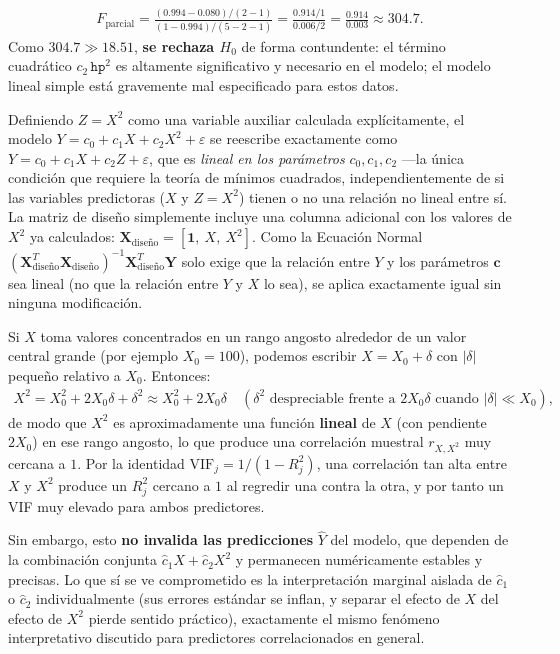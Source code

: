 \begin{solproblema}
	\begin{align}
		F_{\text{parcial}} = \frac{(0.994-0.080)/(2-1)}{(1-0.994)/(5-2-1)} = \frac{0.914/1}{0.006/2} = \frac{0.914}{0.003} \approx304.7.
	\end{align}
	Como $304.7\gg18.51$, \textbf{se rechaza $H_0$} de forma contundente: el término cuadrático $c_2\,\texttt{hp}^2$ es altamente significativo y necesario en el modelo; el modelo lineal simple está gravemente mal especificado para estos datos.
\end{solproblema}

\begin{solproblema}[prob:c772cd1]
	Definiendo $Z=X^2$ como una variable auxiliar calculada explícitamente, el modelo $Y=c_0+c_1X+c_2X^2+\varepsilon$ se reescribe exactamente como $Y=c_0+c_1X+c_2Z+\varepsilon$, que es \emph{lineal en los parámetros} $c_0,c_1,c_2$ —la única condición que requiere la teoría de mínimos cuadrados, independientemente de si las variables predictoras ($X$ y $Z=X^2$) tienen o no una relación no lineal entre sí. La matriz de diseño simplemente incluye una columna adicional con los valores de $X^2$ ya calculados: $\mathbf{X}_{\text{diseño}}=[\mathbf{1},\ X,\ X^2]$. Como la Ecuación Normal $(\mathbf{X}_{\text{diseño}}^T\mathbf{X}_{\text{diseño}})^{-1}\mathbf{X}_{\text{diseño}}^T\mathbf{Y}$ solo exige que la relación entre $Y$ y los parámetros $\mathbf{c}$ sea lineal (no que la relación entre $Y$ y $X$ lo sea), se aplica exactamente igual sin ninguna modificación.
\end{solproblema}

\begin{solproblema}[prob:6954b16]
	Si $X$ toma valores concentrados en un rango angosto alrededor de un valor central grande (por ejemplo $X_0=100$), podemos escribir $X=X_0+\delta$ con $|\delta|$ pequeño relativo a $X_0$. Entonces:
	\begin{align}
		X^2 = X_0^2+2X_0\delta+\delta^2 \approx X_0^2+2X_0\delta \quad (\delta^2 \text{ despreciable frente a } 2X_0\delta \text{ cuando } |\delta|\ll X_0),
	\end{align}
	de modo que $X^2$ es aproximadamente una función \textbf{lineal} de $X$ (con pendiente $2X_0$) en ese rango angosto, lo que produce una correlación muestral $r_{X,X^2}$ muy cercana a $1$. Por la identidad $\text{VIF}_j=1/(1-R_j^2)$, una correlación tan alta entre $X$ y $X^2$ produce un $R_j^2$ cercano a $1$ al regredir una contra la otra, y por tanto un VIF muy elevado para ambos predictores.

	Sin embargo, esto \textbf{no invalida las predicciones} $\hat Y$ del modelo, que dependen de la combinación conjunta $\hat c_1X+\hat c_2X^2$ y permanecen numéricamente estables y precisas. Lo que sí se ve comprometido es la interpretación marginal aislada de $\hat c_1$ o $\hat c_2$ individualmente (sus errores estándar se inflan, y separar el efecto de $X$ del efecto de $X^2$ pierde sentido práctico), exactamente el mismo fenómeno interpretativo discutido para predictores correlacionados en general.
\end{solproblema}

